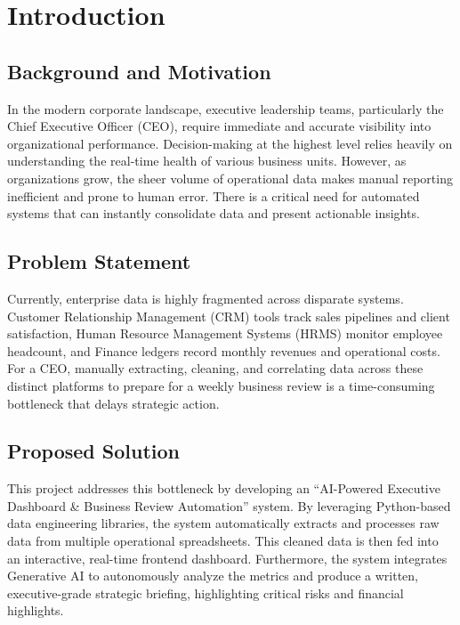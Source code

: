 \documentclass{book}
\begin{document}



\tableofcontents
\listoffigures
\listoftables







\chapter{Introduction}

\section{Background and Motivation}
In the modern corporate landscape, executive leadership teams, particularly the Chief Executive Officer (CEO), require immediate and accurate visibility into organizational performance. Decision-making at the highest level relies heavily on understanding the real-time health of various business units. However, as organizations grow, the sheer volume of operational data makes manual reporting inefficient and prone to human error. There is a critical need for automated systems that can instantly consolidate data and present actionable insights.

\section{Problem Statement}
Currently, enterprise data is highly fragmented across disparate systems. Customer Relationship Management (CRM) tools track sales pipelines and client satisfaction, Human Resource Management Systems (HRMS) monitor employee headcount, and Finance ledgers record monthly revenues and operational costs. For a CEO, manually extracting, cleaning, and correlating data across these distinct platforms to prepare for a weekly business review is a time-consuming bottleneck that delays strategic action.

\section{Proposed Solution}
This project addresses this bottleneck by developing an ``AI-Powered Executive Dashboard \& Business Review Automation'' system. By leveraging Python-based data engineering libraries, the system automatically extracts and processes raw data from multiple operational spreadsheets. This cleaned data is then fed into an interactive, real-time frontend dashboard. Furthermore, the system integrates Generative AI to autonomously analyze the metrics and produce a written, executive-grade strategic briefing, highlighting critical risks and financial highlights.
\end{document}
